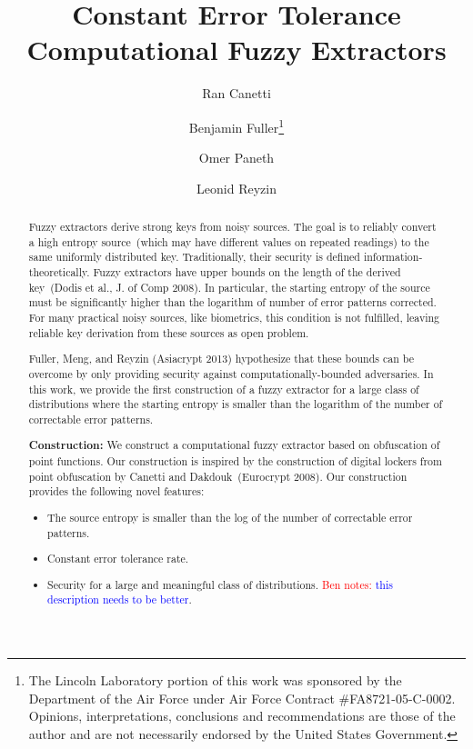 \documentclass[11pt]{article}
\title{Constant Error Tolerance Computational Fuzzy Extractors}
\author{Ran Canetti \and Benjamin Fuller\footnote{The Lincoln Laboratory portion of this
work was sponsored by the Department of the Air Force under Air Force
Contract
\#FA8721-05-C-0002.  Opinions,
interpretations, conclusions and recommendations are those of the author
and
are not necessarily endorsed by the United States Government.} \and Omer Paneth \and Leonid Reyzin}
\newcommand{\authnote}[2]{{\textcolor{red}{\textsf{#1 notes: }\textcolor{blue}{ #2}}\marginpar{\textcolor{red}{\textbf{!!!!!}}}}}
\newcommand{\authnote}[2]{}
\newcommand{\bnote}[1]{{\authnote{Ben}{#1}}}
\begin{document}
\maketitle


\begin{abstract} 
Fuzzy extractors derive strong keys from noisy sources.  The goal is to reliably convert a high entropy source~(which may have different values on repeated readings) to the same uniformly distributed key.  Traditionally, their security is defined information-theoretically.  Fuzzy extractors have upper bounds on the length of the derived key~(Dodis et al., J. of Comp 2008).  In particular, the starting entropy of the source must be significantly higher than the logarithm of number of error patterns corrected.  For many practical noisy sources, like biometrics, this condition is not fulfilled, leaving reliable key derivation from these sources as open problem.  

Fuller, Meng, and Reyzin (Asiacrypt 2013) hypothesize that these bounds can be overcome by only providing security against computationally-bounded adversaries. 
In this work, we provide the first construction of a fuzzy extractor for a large class of distributions where the starting entropy is smaller than the logarithm of the number of correctable error patterns.

\textbf{Construction:} We construct a computational fuzzy extractor based on obfuscation of point functions.  
Our construction is inspired by the construction of digital lockers from point obfuscation by Canetti and Dakdouk~(Eurocrypt 2008).  
Our construction provides the following novel features:
\begin{itemize}
\item The source entropy is smaller than the log of the number of correctable error patterns.  
\item Constant error tolerance rate.  
\item Security for a large and meaningful class of distributions.  \bnote{this description needs to be better}.
\end{itemize}
\end{abstract}
\end{document}
